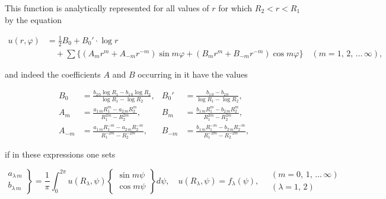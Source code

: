 \documentclass{article}
\begin{document}
This function is analytically represented for all values of $r$ for which $R_2 < r < R_1$ by the equation

\[

\begin{aligned}

u(r, \varphi) &= \frac{1}{2} B_0 + B_0' \cdot \log r \\

&\quad + \sum \{(A_m r^m + A_{-m} r^{-m}) \sin m\varphi + (B_m r^m + B_{-m} r^{-m}) \cos m\varphi\} \quad (m = 1, \, 2, \, \dots \, \infty),

\end{aligned}

\]




and indeed the coefficients $A$ and $B$ occurring in it have the values

\[

\begin{aligned}

B_0 &= \frac{b_{2\,0} \log R_1 - b_{1\,0} \log R_2}{\log R_1 - \log R_2}, & B_0' &= \frac{b_{1\,0} - b_{2\,0}}{\log R_1 - \log R_2}, \\

A_m &= \frac{a_{1\,m} R_1^m - a_{2\,m} R_2^m}{R_1^{2m} - R_2^{2m}}, & B_m &= \frac{b_{1\,m} R_1^m - b_{2\,m} R_2^m}{R_1^{2m} - R_2^{2m}}, \\

A_{-m} &= \frac{a_{1\,m} R_1^{-m} - a_{2\,m} R_2^{-m}}{R_1^{-2m} - R_2^{-2m}}, & B_{-m} &= \frac{b_{1\,m} R_1^{-m} - b_{2\,m} R_2^{-m}}{R_1^{-2m} - R_2^{-2m}},

\end{aligned}

\]

if in these expressions one sets

\[

\left. \begin{array}{c} a_{\lambda\,m} \\ b_{\lambda\,m} \end{array} \right\} = \frac{1}{\pi} \int_0^{2\pi} u(R_\lambda, \psi) \left\{ \begin{array}{c} \sin m\psi \\ \cos m\psi \end{array} \right\} d\psi, \quad u(R_\lambda, \psi) = f_\lambda(\psi), \quad \begin{array}{c} (m = 0, \, 1, \, \dots \, \infty) \\ (\lambda = 1, \, 2) \end{array}

\]
\end{document}
